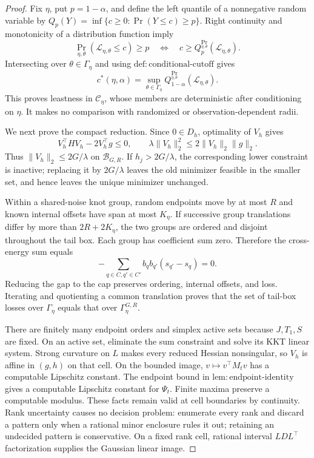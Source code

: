 \documentclass{article}
\begin{document}
\begin{proof}
Fix \(\eta\), put \(p=1-\alpha\), and define the left quantile of a nonnegative random variable by
\(Q_p(Y)=\inf\{c\geq0:\Pr(Y\leq c)\geq p\}\).  Right continuity and monotonicity of a distribution function imply
\[
 \Pr_{\eta,\theta}(\mathcal L_{\eta,\theta}\leq c)\geq p
 \quad\Longleftrightarrow\quad
 c\geq Q_p^{\Pr_{\eta,\theta}}(\mathcal L_{\eta,\theta}).
\]
Intersecting over \(\theta\in\Gamma_\eta\) and using
\(\mathrm{def:conditional\mbox{-}cutoff}\) gives
\[
 c^*(\eta,\alpha)=\sup_{\theta\in\Gamma_\eta}
 Q_{1-\alpha}^{\Pr_{\eta,\theta}}(\mathcal L_{\eta,\theta}).
\]
This proves leastness in \(\mathscr C_\eta\), whose members are deterministic after conditioning on \(\eta\).  It makes no comparison with randomized or observation-dependent radii.

We next prove the compact reduction.  Since \(0\in D_h\), optimality of \(V_h\) gives
\[
 V_h^\top HV_h-2V_h^\top g\leq0,
 \qquad
 \lambda\|V_h\|_2^2\leq2\|V_h\|_2\|g\|_2.
\]
Thus \(\|V_h\|_2\leq2G/\lambda\) on \(\mathcal B_{G,R}\).  If
\(h_j>2G/\lambda\), the corresponding lower constraint is inactive; replacing it by \(2G/\lambda\) leaves the old minimizer feasible in the smaller set, and hence leaves the unique minimizer unchanged.

Within a shared-noise knot group, random endpoints move by at most \(R\) and known internal offsets have span at most \(K_\eta\).  If successive group translations differ by more than \(2R+2K_\eta\), the two groups are ordered and disjoint throughout the tail box.  Each group has coefficient sum zero.  Therefore the cross-energy sum equals
\[
 -\sum_{q\in C,q'\in C'}b_qb_{q'}(s_{q'}-s_q)=0.
\]
Reducing the gap to the cap preserves ordering, internal offsets, and loss.  Iterating and quotienting a common translation proves that the set of tail-box losses over \(\Gamma_\eta\) equals that over \(\Gamma_\eta^{G,R}\).

There are finitely many endpoint orders and simplex active sets because \(J,T_1,S\) are fixed.  On an active set, eliminate the sum constraint and solve its KKT linear system.  Strong curvature on \(L\) makes every reduced Hessian nonsingular, so \(V_h\) is affine in \((g,h)\) on that cell.  On the bounded image, \(v\mapsto v^\top M_tv\) has a computable Lipschitz constant.  The endpoint bound in \(\mathrm{lem:endpoint\mbox{-}identity}\) gives a computable Lipschitz constant for \(\Psi_t\).  Finite maxima preserve a computable modulus.  These facts remain valid at cell boundaries by continuity.  Rank uncertainty causes no decision problem: enumerate every rank and discard a pattern only when a rational minor enclosure rules it out; retaining an undecided pattern is conservative.  On a fixed rank cell, rational interval \(LDL^\top\) factorization supplies the Gaussian linear image.


\end{proof}
\end{document}
